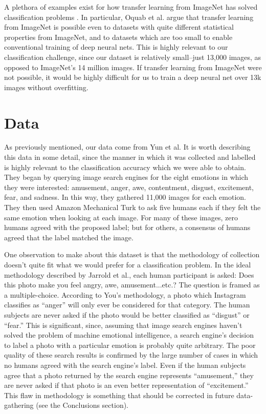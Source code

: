 \documentclass[10pt,twocolumn,letterpaper]{article}
\begin{document}
A plethora of examples exist for how transfer learning from ImageNet has solved  classification problems \cite{transferexampleprimary}\cite{transferexample1}\cite{transferexample2}. In particular, Oquab et al.\cite{transferexampleprimary} argue that transfer learning from ImageNet is possible even to datasets with quite different statistical properties from ImageNet, and to datasets which are too small to enable conventional training of deep neural nets. This is highly relevant to our classification challenge, since our dataset is relatively small--just 13,000 images, as opposed to ImageNet's 14 million images. If transfer learning from ImageNet were not possible, it would be highly difficult for us to train a deep neural net over 13k images without overfitting.

\section{Data}
As previously mentioned, our data come from Yun et al\cite{ourdata}. It is worth describing this data in some detail, since the manner in which it was collected and labelled is highly relevant to the classification accuracy which we were able to obtain. They began by querying image search engines for the eight emotions in which they were interested: amusement, anger, awe, contentment, disgust, excitement, fear, and sadness. In this way, they gathered 11,000 images for each emotion. They then used Amazon Mechanical Turk to ask five humans each if they felt the same emotion when looking at each image. For many of these images, zero humans agreed with the proposed label; but for others, a consensus of humans agreed that the label matched the image.

One observation to make about this dataset is that the methodology of collection doesn't quite fit what we would prefer for a classification problem. In the ideal methodology described by Jarrold et al.\cite{methodologyproposed}, each human participant is asked: Does this photo make you feel angry, awe, amusement...etc.? The question is framed as a multiple-choice. According to You's methodology, a photo which Instagram classifies as ``anger'' will only ever be considered for that category. The human subjects are never asked if the photo would be better classified as ``disgust'' or ``fear.'' This is significant, since, assuming that image search engines haven't solved the problem of machine emotional intelligence, a search engine's decision to label a photo with a particular emotion is probably quite arbitrary. The poor quality of these search results is confirmed by the large number of cases in which no humans agreed with the search engine's label. Even if the human subjects agree that a photo returned by the search engine represents ``amusement,'' they are never asked if that photo is an even better representation of ``excitement.'' This flaw in methodology is something that should be corrected in future data-gathering (see the Conclusions section).
\end{document}
